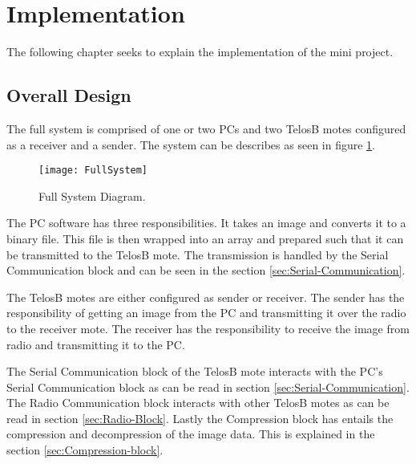 \section{Implementation}
The following chapter seeks to explain the implementation of the mini project.

\subsection{Overall Design}
The full system is comprised of one or two PCs and two TelosB motes configured as a receiver and a sender. The system can be describes as seen in figure \ref{FullSystem}. 
\begin{figure}[H]
	\centering
	\texttt{[image: FullSystem]}
	\caption{Full System Diagram.}
	\label{FullSystem}
\end{figure}
The PC software has three responsibilities. It takes an image and converts it to a binary file. This file is then wrapped into an array and prepared such that it can be transmitted to the TelosB mote. The transmission is handled by the Serial Communication block and can be seen in the section \ref{sec:Serial-Communication}.

The TelosB motes are either configured as sender or receiver.  The sender has the responsibility of getting an image from the PC and transmitting it over the radio to the receiver mote. The receiver has the responsibility to receive the image from radio and transmitting it to the PC.

The Serial Communication block of the TelosB mote interacts with the PC's Serial Communication block as can be read in section \ref{sec:Serial-Communication}. 
The Radio Communication block interacts with other TelosB motes as can be read in section \ref{sec:Radio-Block}. 
Lastly the Compression block has entails the compression and decompression of the image data. 
This is explained in the section \ref{sec:Compression-block}.

